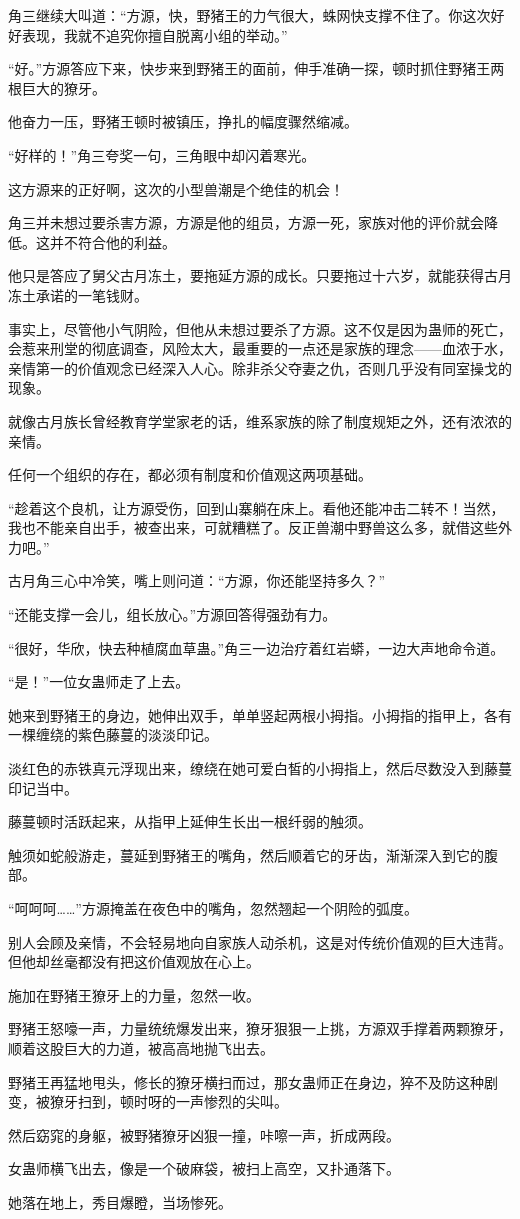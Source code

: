 \begin{this_body}
角三继续大叫道：“方源，快，野猪王的力气很大，蛛网快支撑不住了。你这次好好表现，我就不追究你擅自脱离小组的举动。”

“好。”方源答应下来，快步来到野猪王的面前，伸手准确一探，顿时抓住野猪王两根巨大的獠牙。

他奋力一压，野猪王顿时被镇压，挣扎的幅度骤然缩减。

“好样的！”角三夸奖一句，三角眼中却闪着寒光。

这方源来的正好啊，这次的小型兽潮是个绝佳的机会！

角三并未想过要杀害方源，方源是他的组员，方源一死，家族对他的评价就会降低。这并不符合他的利益。

他只是答应了舅父古月冻土，要拖延方源的成长。只要拖过十六岁，就能获得古月冻土承诺的一笔钱财。

事实上，尽管他小气阴险，但他从未想过要杀了方源。这不仅是因为蛊师的死亡，会惹来刑堂的彻底调查，风险太大，最重要的一点还是家族的理念——血浓于水，亲情第一的价值观念已经深入人心。除非杀父夺妻之仇，否则几乎没有同室操戈的现象。

就像古月族长曾经教育学堂家老的话，维系家族的除了制度规矩之外，还有浓浓的亲情。

任何一个组织的存在，都必须有制度和价值观这两项基础。

“趁着这个良机，让方源受伤，回到山寨躺在床上。看他还能冲击二转不！当然，我也不能亲自出手，被查出来，可就糟糕了。反正兽潮中野兽这么多，就借这些外力吧。”

古月角三心中冷笑，嘴上则问道：“方源，你还能坚持多久？”

“还能支撑一会儿，组长放心。”方源回答得强劲有力。

“很好，华欣，快去种植腐血草蛊。”角三一边治疗着红岩蟒，一边大声地命令道。

“是！”一位女蛊师走了上去。

她来到野猪王的身边，她伸出双手，单单竖起两根小拇指。小拇指的指甲上，各有一棵缠绕的紫色藤蔓的淡淡印记。

淡红色的赤铁真元浮现出来，缭绕在她可爱白皙的小拇指上，然后尽数没入到藤蔓印记当中。

藤蔓顿时活跃起来，从指甲上延伸生长出一根纤弱的触须。

触须如蛇般游走，蔓延到野猪王的嘴角，然后顺着它的牙齿，渐渐深入到它的腹部。

“呵呵呵……”方源掩盖在夜色中的嘴角，忽然翘起一个阴险的弧度。

别人会顾及亲情，不会轻易地向自家族人动杀机，这是对传统价值观的巨大违背。但他却丝毫都没有把这价值观放在心上。

施加在野猪王獠牙上的力量，忽然一收。

野猪王怒嚎一声，力量统统爆发出来，獠牙狠狠一上挑，方源双手撑着两颗獠牙，顺着这股巨大的力道，被高高地抛飞出去。

野猪王再猛地甩头，修长的獠牙横扫而过，那女蛊师正在身边，猝不及防这种剧变，被獠牙扫到，顿时呀的一声惨烈的尖叫。

然后窈窕的身躯，被野猪獠牙凶狠一撞，咔嚓一声，折成两段。

女蛊师横飞出去，像是一个破麻袋，被扫上高空，又扑通落下。

她落在地上，秀目爆瞪，当场惨死。

\end{this_body}

